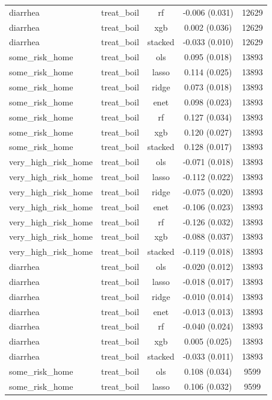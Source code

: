 \begin{table}[htbp]
\begin{tabular}{lcccc}
diarrhea & treat_boil & rf & -0.006 (0.031) & 12629 \\
diarrhea & treat_boil & xgb & 0.002 (0.036) & 12629 \\
diarrhea & treat_boil & stacked & -0.033 (0.010) & 12629 \\
some_risk_home & treat_boil & ols & 0.095 (0.018) & 13893 \\
some_risk_home & treat_boil & lasso & 0.114 (0.025) & 13893 \\
some_risk_home & treat_boil & ridge & 0.073 (0.018) & 13893 \\
some_risk_home & treat_boil & enet & 0.098 (0.023) & 13893 \\
some_risk_home & treat_boil & rf & 0.127 (0.034) & 13893 \\
some_risk_home & treat_boil & xgb & 0.120 (0.027) & 13893 \\
some_risk_home & treat_boil & stacked & 0.128 (0.017) & 13893 \\
very_high_risk_home & treat_boil & ols & -0.071 (0.018) & 13893 \\
very_high_risk_home & treat_boil & lasso & -0.112 (0.022) & 13893 \\
very_high_risk_home & treat_boil & ridge & -0.075 (0.020) & 13893 \\
very_high_risk_home & treat_boil & enet & -0.106 (0.023) & 13893 \\
very_high_risk_home & treat_boil & rf & -0.126 (0.032) & 13893 \\
very_high_risk_home & treat_boil & xgb & -0.088 (0.037) & 13893 \\
very_high_risk_home & treat_boil & stacked & -0.119 (0.018) & 13893 \\
diarrhea & treat_boil & ols & -0.020 (0.012) & 13893 \\
diarrhea & treat_boil & lasso & -0.018 (0.017) & 13893 \\
diarrhea & treat_boil & ridge & -0.010 (0.014) & 13893 \\
diarrhea & treat_boil & enet & -0.013 (0.013) & 13893 \\
diarrhea & treat_boil & rf & -0.040 (0.024) & 13893 \\
diarrhea & treat_boil & xgb & 0.005 (0.025) & 13893 \\
diarrhea & treat_boil & stacked & -0.033 (0.011) & 13893 \\
some_risk_home & treat_boil & ols & 0.108 (0.034) & 9599 \\
some_risk_home & treat_boil & lasso & 0.106 (0.032) & 9599 \\

\end{tabular}
\end{table}
